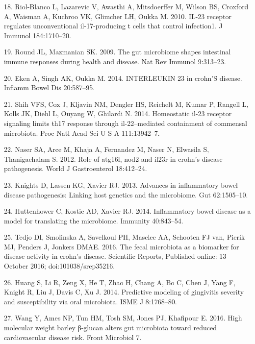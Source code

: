 \documentclass[11pt,]{article}
\begin{document}
\hypertarget{ref-Riol-Blanco_IL23microbiome_2010}{}
18. Riol-Blanco L, Lazarevic V, Awasthi A, Mitsdoerffer M, Wilson BS,
Croxford A, Waisman A, Kuchroo VK, Glimcher LH, Oukka M. 2010. IL-23
receptor regulates unconventional il-17-producing t cells that control
infection1. J Immunol 184:1710--20.

\hypertarget{ref-Round_IL23microbiome_2009}{}
19. Round JL, Mazmanian SK. 2009. The gut microbiome shapes intestinal
immune responses during health and disease. Nat Rev Immunol 9:313--23.

\hypertarget{ref-Eken_IL23CD_2014}{}
20. Eken A, Singh AK, Oukka M. 2014. INTERLEUKIN 23 in crohn'S disease.
Inflamm Bowel Dis 20:587--95.

\hypertarget{ref-Shih_IL23Th17_2014}{}
21. Shih VFS, Cox J, Kljavin NM, Dengler HS, Reichelt M, Kumar P,
Rangell L, Kolls JK, Diehl L, Ouyang W, Ghilardi N. 2014. Homeostatic
il-23 receptor signaling limits th17 response through il-22--mediated
containment of commensal microbiota. Proc Natl Acad Sci U S A
111:13942--7.

\hypertarget{ref-Naser_NOD2IL23R_2012}{}
22. Naser SA, Arce M, Khaja A, Fernandez M, Naser N, Elwasila S,
Thanigachalam S. 2012. Role of atg16l, nod2 and il23r in crohn's disease
pathogenesis. World J Gastroenterol 18:412--24.

\hypertarget{ref-Knights_IBDpath_2013}{}
23. Knights D, Lassen KG, Xavier RJ. 2013. Advances in inflammatory
bowel disease pathogenesis: Linking host genetics and the microbiome.
Gut 62:1505--10.

\hypertarget{ref-Huttenhower_IBD_2014}{}
24. Huttenhower C, Kostic AD, Xavier RJ. 2014. Inflammatory bowel
disease as a model for translating the microbiome. Immunity 40:843--54.

\hypertarget{ref-tedjo_CDactivity_2016}{}
25. Tedjo DI, Smolinska A, Savelkoul PH, Masclee AA, Schooten FJ van,
Pierik MJ, Penders J, Jonkers DMAE. 2016. The fecal microbiota as a
biomarker for disease activity in crohn's disease. Scientific Reports,
Published online: 13 October 2016; doi:101038/srep35216.

\hypertarget{ref-Huang_gingivitis_2014}{}
26. Huang S, Li R, Zeng X, He T, Zhao H, Chang A, Bo C, Chen J, Yang F,
Knight R, Liu J, Davis C, Xu J. 2014. Predictive modeling of gingivitis
severity and susceptibility via oral microbiota. ISME J 8:1768--80.

\hypertarget{ref-Wang_cvdrisk_2016}{}
27. Wang Y, Ames NP, Tun HM, Tosh SM, Jones PJ, Khafipour E. 2016. High
molecular weight barley β-glucan alters gut microbiota toward reduced
cardiovascular disease risk. Front Microbiol 7.
\end{document}
